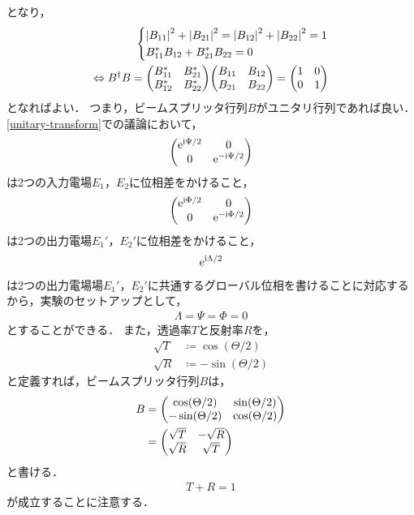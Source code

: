 \documentclass{report}
\begin{document}
    となり，
    \begin{align}
      \begin{dcases}
        \abs{B_{11}}^2 + \abs{B_{21}}^2 = \abs{B_{12}}^2 + \abs{B_{22}}^2 = 1 \\ 
        B_{11}^*B_{12} + B_{21}^*B_{22} = 0\\ 
      \end{dcases} \\ 
      \Leftrightarrow 
      B^{\dag}B = \mqty(B_{11}^* & B_{21}^* \\ B_{12}^* & B_{22}^*)\mqty(B_{11} & B_{12} \\ B_{21} & B_{22}) = \mqty(1 & 0 \\ 0 & 1)
    \end{align}
    となればよい．
    つまり，ビームスプリッタ行列$B$がユニタリ行列であれば良い．
    \ref{unitary-transform}での議論において，
    \begin{align}
      \mqty(\e^{\i\Psi/2} & 0 \\ 0 & \e^{-\i\Psi/2})
    \end{align}
    は2つの入力電場$E_1$，$E_2$に位相差をかけること，
    \begin{align}
      \mqty(\e^{\i\Phi/2} & 0 \\ 0 & \e^{-\i\Phi/2})
    \end{align}
    は2つの出力電場$E_1'$，$E_2'$に位相差をかけること，
    \begin{align}
      \mathrm{e}^{\mathrm{i}\Lambda/2}
    \end{align}
    は2つの出力電場場$E_1'$，$E_2'$に共通するグローバル位相を書けることに対応するから，実験のセットアップとして，
    \begin{align}
      \Lambda = \Psi = \Phi = 0
    \end{align}
    とすることができる．
    また，透過率$T$と反射率$R$を，
    \begin{align}
      \sqrt{T} &\coloneqq \cos(\Theta / 2) \\ 
      \sqrt{R} &\coloneqq -\sin(\Theta / 2)
    \end{align}
    と定義すれば，ビームスプリッタ行列$B$は，
    \begin{align}
      B &= \mqty(
        \cos(\Theta / 2) & \sin(\Theta / 2) \\ 
        -\sin(\Theta / 2) & \cos(\Theta / 2)
      ) \\ 
      &= \mqty(\sqrt{T} & -\sqrt{R} \\ \sqrt{R} & \sqrt{T})\label{beam-splitter-no-delay}
    \end{align}
    と書ける．
    \begin{align}
      T + R = 1
    \end{align}
    が成立することに注意する．
\end{document}
